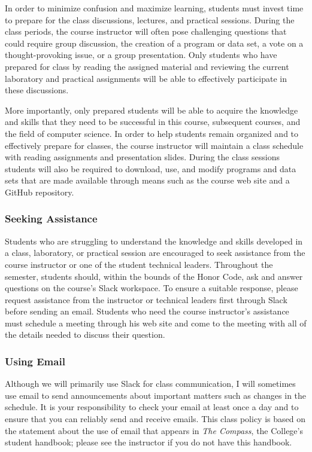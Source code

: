 \documentclass[11pt]{article}
\newcommand{\instructorpronoun}[1]{his}
\begin{document}
In order to minimize confusion and maximize learning, students must invest time
to prepare for the class discussions, lectures, and practical sessions. During
the class periods, the course instructor will often pose challenging questions
that could require group discussion, the creation of a program or data set, a
vote on a thought-provoking issue, or a group presentation. Only students who
have prepared for class by reading the assigned material and reviewing the
current laboratory and practical assignments will be able to effectively
participate in these discussions.

More importantly, only prepared students will be able to acquire the knowledge
and skills that they need to be successful in this course, subsequent courses,
and the field of computer science. In order to help students remain organized
and to effectively prepare for classes, the course instructor will maintain a
class schedule with reading assignments and presentation slides. During the
class sessions students will also be required to download, use, and modify
programs and data sets that are made available through means such as the course
web site and a GitHub repository.

\subsubsection*{Seeking Assistance}

Students who are struggling to understand the knowledge and skills developed in
a class, laboratory, or practical session are encouraged to seek assistance from
the course instructor or one of the student technical leaders. Throughout the
semester, students should, within the bounds of the Honor Code, ask and answer
questions on the course's Slack workspace. To ensure a suitable response, please
request assistance from the instructor or technical leaders first through Slack
before sending an email. Students who need the course instructor's assistance
must schedule a meeting through \instructorpronoun{} web site and come to the
meeting with all of the details needed to discuss their question.

\subsubsection*{Using Email}

Although we will primarily use Slack for class communication, I will sometimes
use email to send announcements about important matters such as changes in the
schedule. It is your responsibility to check your email at least once a day and
to ensure that you can reliably send and receive emails. This class policy is
based on the statement about the use of email that appears in {\em The Compass},
the College's student handbook; please see the instructor if you do not have
this handbook.
\end{document}
